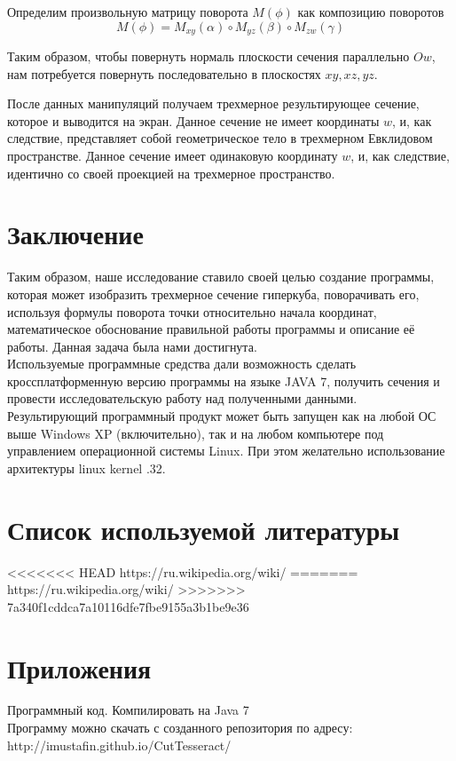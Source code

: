 \documentclass[12pt, a4paper, twoside]{report}
\begin{document}
																		Определим произвольную матрицу поворота $M(\phi)$ как композицию поворотов $$M(\phi)=M_{xy}(\alpha)\circ M_{yz}(\beta)\circ M_{zw}(\gamma)$$

Таким образом, чтобы повернуть нормаль плоскости сечения параллельно $Ow$, нам потребуется повернуть последовательно в плоскостях $xy, xz, yz$.

После данных манипуляций получаем трехмерное результирующее сечение, которое и выводится на экран. Данное сечение не имеет координаты $w$, и, как следствие, представляет собой геометрическое тело в трехмерном Евклидовом пространстве.
Данное сечение имеет одинаковую координату $w$, и, как следствие, идентично со своей проекцией на трехмерное пространство.

\section{Заключение}
Таким образом, наше исследование ставило своей целью создание программы, которая может изобразить трехмерное сечение гиперкуба, поворачивать его, используя формулы поворота точки относительно начала координат, математическое обоснование правильной работы программы и описание её работы. Данная задача была нами достигнута.
\\

Используемые программные средства дали возможность сделать кроссплатформенную версию программы на языке JAVA 7, получить сечения и провести исследовательскую работу над полученными данными. \\

Результирующий программный продукт может быть запущен как на любой ОС выше Windows XP (включительно), так и на любом компьютере под управлением операционной системы Linux. При этом желательно использование архитектуры linux kernel .32.
\section{Список используемой литературы}
<<<<<<< HEAD
https://ru.wikipedia.org/wiki/%
=======
https://ru.wikipedia.org/wiki/
>>>>>>> 7a340f1cddca7a10116dfe7fbe9155a3b1be9e36
\section{Приложения}
Программный код. Компилировать на Java 7 \\
Программу можно скачать с созданного репозитория по адресу: \\
http://imustafin.github.io/CutTesseract/ \\
\end{document}
